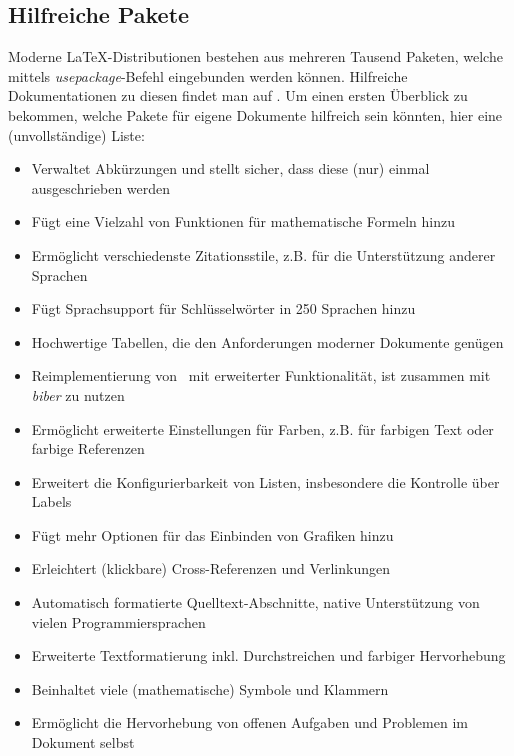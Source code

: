 \subsection{Hilfreiche Pakete}%
\label{sec:Schreiben:Pakete}

Moderne \LaTeX-Distributionen bestehen aus mehreren Tausend Paketen, welche mittels \emph{usepackage}-Befehl eingebunden werden können.
Hilfreiche Dokumentationen zu diesen findet man auf .
Um einen ersten Überblick zu bekommen, welche Pakete für eigene Dokumente hilfreich sein könnten, hier eine (unvollständige) Liste:

\smallskip
\begin{itemize}[label={\faCube}]
    \item {} Verwaltet Abkürzungen und stellt sicher, dass diese (nur) einmal ausgeschrieben werden
    \item {} Fügt eine Vielzahl von Funktionen für mathematische Formeln hinzu
    \item {} Ermöglicht verschiedenste Zitationsstile, z.B. für die Unterstützung anderer Sprachen
    \item {} Fügt Sprachsupport für Schlüsselwörter in 250 Sprachen hinzu
    \item {} Hochwertige Tabellen, die den Anforderungen moderner Dokumente genügen
    \item {} Reimplementierung von \bibtex\ mit erweiterter Funktionalität, ist zusammen mit \emph{biber} zu nutzen
    \item {} Ermöglicht erweiterte Einstellungen für Farben, z.B. für farbigen Text oder farbige Referenzen
    \item {} Erweitert die Konfigurierbarkeit von Listen, insbesondere die Kontrolle über Labels
    \item {} Fügt mehr Optionen für das  Einbinden von Grafiken hinzu
    \item {} Erleichtert (klickbare) Cross-Referenzen und Verlinkungen
    \item {} Automatisch formatierte Quelltext-Abschnitte, native Unterstützung von vielen Programmiersprachen
    \item {} Erweiterte Textformatierung inkl. Durchstreichen und farbiger Hervorhebung
    \item {} Beinhaltet viele (mathematische) Symbole und Klammern
    \item {} Ermöglicht die Hervorhebung von offenen Aufgaben und Problemen im Dokument selbst
\end{itemize}
\smallskip

